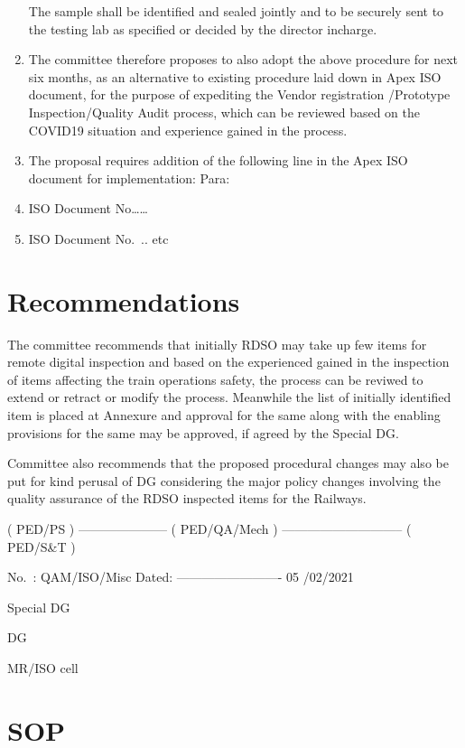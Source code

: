 \documentclass[
]{article}
\begin{document}
\begin{enumerate}
  The sample shall be identified and sealed jointly and to be securely
  sent to the testing lab as specified or decided by the director
  incharge.
\item
  The committee therefore proposes to also adopt the above procedure for
  next six months, as an alternative to existing procedure laid down in
  Apex ISO document, for the purpose of expediting the Vendor
  registration /Prototype Inspection/Quality Audit process, which can be
  reviewed based on the COVID19 situation and experience gained in the
  process.
\item
  The proposal requires addition of the following line in the Apex ISO
  document for implementation: Para:
\item
  ISO Document No\ldots\ldots{}\\
\item
  ISO Document No.~.. etc
\end{enumerate}

\newpage

\hypertarget{recommendations-1}{%
\section{Recommendations}\label{recommendations-1}}

The committee recommends that initially RDSO may take up few items for
remote digital inspection and based on the experienced gained in the
inspection of items affecting the train operations safety, the process
can be reviwed to extend or retract or modify the process. Meanwhile the
list of initially identified item is placed at Annexure and approval for
the same along with the enabling provisions for the same may be
approved, if agreed by the Special DG.

Committee also recommends that the proposed procedural changes may also
be put for kind perusal of DG considering the major policy changes
involving the quality assurance of the RDSO inspected items for the
Railways.

( PED/PS ) --------------------- ( PED/QA/Mech )
----------------------------- ( PED/S\&T )

No.~: QAM/ISO/Misc Dated: ------------------------- 05 /02/2021

Special DG

DG

MR/ISO cell

\pagebreak

\hypertarget{sop}{%
\section{SOP}\label{sop}}
\end{document}
